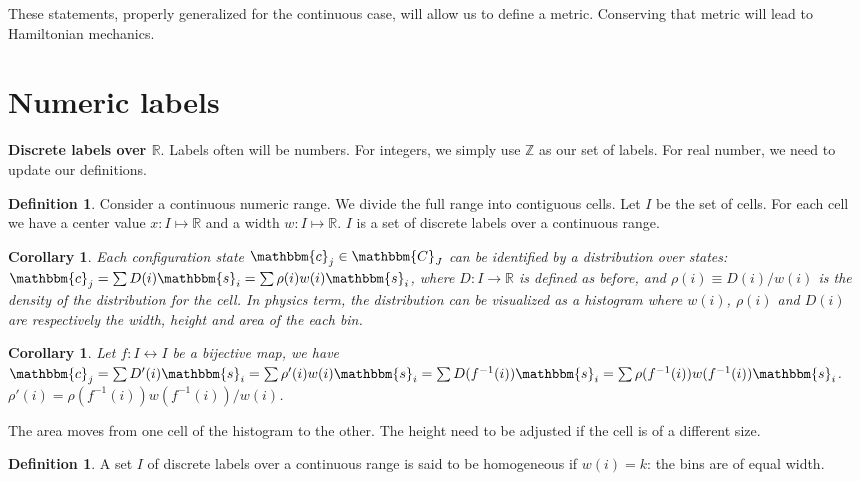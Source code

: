 \documentclass[twocolumn,floatfix,nofootinbib]{revtex4}   %
\theoremstyle{theorem}
\newtheorem{cor}[thm]{Corollary}
\theoremstyle{definition}
\newtheorem{defn}[thm]{Definition}
\begin{document}
These statements, properly generalized for the continuous case, will allow us to define a metric. Conserving that metric will lead to Hamiltonian mechanics.

\section{Numeric labels}

\textbf{Discrete labels over $\mathbb{R}$}. Labels often will be numbers. For integers, we simply use $\mathbb{Z}$ as our set of labels. For real number, we need to update our definitions.

\begin{defn}\label{disclabelsoverr}
Consider a continuous numeric range. We divide the full range into contiguous cells. Let $I$ be the set of cells. For each cell we have a center value $x: I \mapsto \mathbb{R}$ and a width $w: I \mapsto \mathbb{R}$. $I$ is a set of discrete labels over a continuous range.
\end{defn}

\begin{cor}\label{disclabelsoverrdist}
Each configuration state $\mathbbm{c}_j \in \mathbbm{C}_J$ can be identified by a distribution over states: $\mathbbm{c}_j=\sum D(i) \mathbbm{s}_i=\sum \rho(i) w(i) \mathbbm{s}_i$, where $D:I\rightarrow\mathbb{R}$ is defined as before, and $\rho(i)\equiv D(i) / w(i)$ is the density of the distribution for the cell. In physics term, the distribution can be visualized as a histogram where $w(i)$, $\rho(i)$ and $D(i)$ are respectively the width, height and area of the each bin.
\end{cor}

\begin{cor}\label{discreteEv}
Let $f: I \leftrightarrow I$ be a bijective map, we have $\mathbbm{c}_j=\sum D'(i) \mathbbm{s}_i=\sum \rho'(i) w(i) \mathbbm{s}_i = \sum D(f^{-1}(i)) \mathbbm{s}_i = \sum \rho(f^{-1}(i)) w(f^{-1}(i)) \mathbbm{s}_i$. $\rho'(i) = \rho(f^{-1}(i)) w(f^{-1}(i)) / w(i)$.
\end{cor}

The area moves from one cell of the histogram to the other. The height need to be adjusted if the cell is of a different size.

\begin{defn}\label{discreteHomogeneous}
A set $I$ of discrete labels over a continuous range is said to be homogeneous if $w(i)=k$: the bins are of equal width.
\end{defn}
\end{document}
